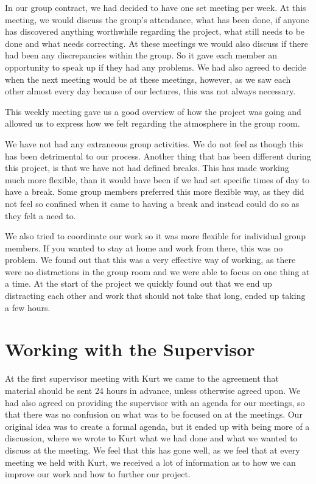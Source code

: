 In our group contract, we had decided to have one set meeting per week.
At this meeting, we would discuss the group's attendance, what has been done, if anyone has discovered anything worthwhile regarding the project, what still needs to be done and what needs correcting. 
At these meetings we would also discuss if there had been any discrepancies within the group.
So it gave each member an opportunity to speak up if they had any problems.
We had also agreed to decide when the next meeting would be at these meetings, however, as we saw each other almost every day because of our lectures, this was not always necessary.

This weekly meeting gave us a good overview of how the project was going and allowed us to express how we felt regarding the atmosphere in the group room. 

We have not had any extraneous group activities. 
We do not feel as though this has been detrimental to our process.
Another thing that has been different during this project, is that we have not had defined breaks. 
This has made working much more flexible, than it would have been if we had set specific times of day to have a break. 
Some group members preferred this more flexible way, as they did not feel so confined when it came to having a break and instead could do so as they felt a need to.

We also tried to coordinate our work so it was more flexible for individual group members.
If you wanted to stay at home and work from there, this was no problem.
We found out that this was a very effective way of working, as there were no distractions in the group room and we were able to focus on one thing at a time.
At the start of the project we quickly found out that we end up distracting each other and work that should not take that long, ended up taking a few hours.

\section{Working with the Supervisor}
At the first supervisor meeting with Kurt we came to the agreement that material should be sent 24 hours in advance, unless otherwise agreed upon. 
We had also agreed on providing the supervisor with an agenda for our meetings, so that there was no confusion on what was to be focused on at the meetings. 
Our original idea was to create a formal agenda, but it ended up with being more of a discussion, where we wrote to Kurt what we had done and what we wanted to discuss at the meeting. 
We feel that this has gone well, as we feel that at every meeting we held with Kurt, we received a lot of information as to how we can improve our work and how to further our project.

